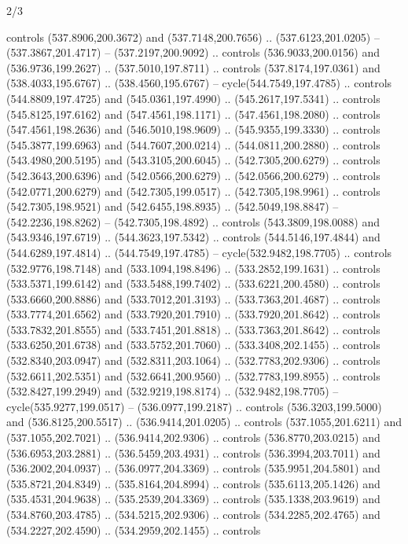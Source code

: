 \begin{flagdescription}{2/3}
\begin{scope}[xshift=0.5\flaglength,yshift=0.5\flagwidth,scale=\flagwidth/495.65]
\begin{scope}[y=0.8pt, x=0.8pt, yscale=-1,shift={(-463.76,-309.78)}]
  controls (537.8906,200.3672) and (537.7148,200.7656) .. (537.6123,201.0205) --
  (537.3867,201.4717) -- (537.2197,200.9092) .. controls (536.9033,200.0156) and
  (536.9736,199.2627) .. (537.5010,197.8711) .. controls (537.8174,197.0361) and
  (538.4033,195.6767) .. (538.4560,195.6767) -- cycle(544.7549,197.4785) ..
  controls (544.8809,197.4725) and (545.0361,197.4990) .. (545.2617,197.5341) ..
  controls (545.8125,197.6162) and (547.4561,198.1171) .. (547.4561,198.2080) ..
  controls (547.4561,198.2636) and (546.5010,198.9609) .. (545.9355,199.3330) ..
  controls (545.3877,199.6963) and (544.7607,200.0214) .. (544.0811,200.2880) ..
  controls (543.4980,200.5195) and (543.3105,200.6045) .. (542.7305,200.6279) ..
  controls (542.3643,200.6396) and (542.0566,200.6279) .. (542.0566,200.6279) ..
  controls (542.0771,200.6279) and (542.7305,199.0517) .. (542.7305,198.9961) ..
  controls (542.7305,198.9521) and (542.6455,198.8935) .. (542.5049,198.8847) --
  (542.2236,198.8262) -- (542.7305,198.4892) .. controls (543.3809,198.0088) and
  (543.9346,197.6719) .. (544.3623,197.5342) .. controls (544.5146,197.4844) and
  (544.6289,197.4814) .. (544.7549,197.4785) -- cycle(532.9482,198.7705) ..
  controls (532.9776,198.7148) and (533.1094,198.8496) .. (533.2852,199.1631) ..
  controls (533.5371,199.6142) and (533.5488,199.7402) .. (533.6221,200.4580) ..
  controls (533.6660,200.8886) and (533.7012,201.3193) .. (533.7363,201.4687) ..
  controls (533.7774,201.6562) and (533.7920,201.7910) .. (533.7920,201.8642) ..
  controls (533.7832,201.8555) and (533.7451,201.8818) .. (533.7363,201.8642) ..
  controls (533.6250,201.6738) and (533.5752,201.7060) .. (533.3408,202.1455) ..
  controls (532.8340,203.0947) and (532.8311,203.1064) .. (532.7783,202.9306) ..
  controls (532.6611,202.5351) and (532.6641,200.9560) .. (532.7783,199.8955) ..
  controls (532.8427,199.2949) and (532.9219,198.8174) .. (532.9482,198.7705) --
  cycle(535.9277,199.0517) -- (536.0977,199.2187) .. controls
  (536.3203,199.5000) and (536.8125,200.5517) .. (536.9414,201.0205) .. controls
  (537.1055,201.6211) and (537.1055,202.7021) .. (536.9414,202.9306) .. controls
  (536.8770,203.0215) and (536.6953,203.2881) .. (536.5459,203.4931) .. controls
  (536.3994,203.7011) and (536.2002,204.0937) .. (536.0977,204.3369) .. controls
  (535.9951,204.5801) and (535.8721,204.8349) .. (535.8164,204.8994) .. controls
  (535.6113,205.1426) and (535.4531,204.9638) .. (535.2539,204.3369) .. controls
  (535.1338,203.9619) and (534.8760,203.4785) .. (534.5215,202.9306) .. controls
  (534.2285,202.4765) and (534.2227,202.4590) .. (534.2959,202.1455) .. controls

\end{scope}
\end{scope}
\end{flagdescription}
